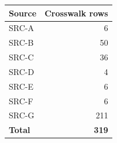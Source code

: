 \begin{tabular}{@{}lr@{}}
\toprule
\textbf{Source} & \textbf{Crosswalk rows}\\
\midrule
SRC-A & 6\\
SRC-B & 50\\
SRC-C & 36\\
SRC-D & 4\\
SRC-E & 6\\
SRC-F & 6\\
SRC-G & 211\\
\midrule
\textbf{Total} & \textbf{319}\\
\bottomrule
\end{tabular}